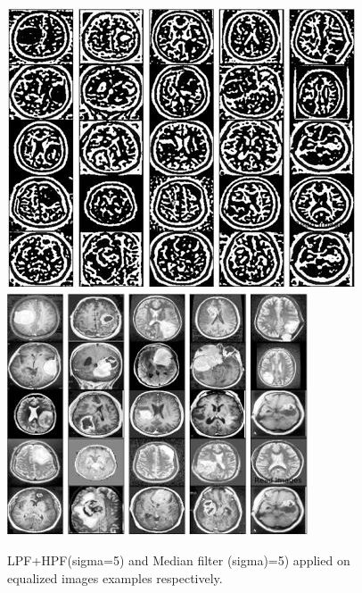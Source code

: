 \documentclass[conference]{IEEEtran}
\begin{document}
\begin{figure}[h]
\centering
\includegraphics[scale=0.40]{figures/lpf_hpf.JPG}
\includegraphics[scale=0.46]{figures/median.JPG}
\caption{LPF+HPF(sigma=5) and Median filter (sigma)=5) applied on equalized images examples respectively.}
\end{figure}
\end{document}
